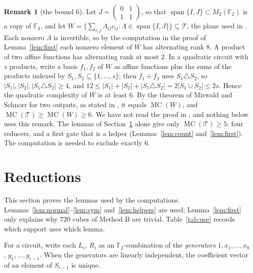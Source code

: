 \documentclass[11pt,a4paper]{article}
\theoremstyle{definition}
\newtheorem{remark}[theorem]{Remark}
\newcommand{\F}{\mathbb{F}}
\newcommand{\Tg}{\mathcal{T}}
\newcommand{\MC}{\operatorname{MC}}
\newcommand{\spn}{\operatorname{span}}
\begin{document}
\begin{remark}[the bound $6$]\label{rem:six}
Let $J=\begin{pmatrix}0&1\\1&1\end{pmatrix}$, so that $\spn\{I,J\}\subset M_2(\F_2)$ is a copy of $\F_4$, and let $W=\{\sum_{i,j}\Lambda_{ij}c_{ij}:\Lambda\in\spn\{I,J\}\}\subseteq\Tg$, the plane used in \cite{SDMF180}. Each nonzero $\Lambda$ is invertible, so by the computation in the proof of Lemma~\ref{lem:first} each nonzero element of $W$ has alternating rank $8$. A product of two affine functions has alternating rank at most $2$. In a quadratic circuit with $s$ products, write a basis $f_1,f_2$ of $W$ as affine functions plus the sums of the products indexed by $S_1,S_2\subseteq\{1,\dots,s\}$; then $f_1+f_2$ uses $S_1\triangle S_2$, so $|S_1|,|S_2|,|S_1\triangle S_2|\ge4$, and $12\le|S_1|+|S_2|+|S_1\triangle S_2|=2|S_1\cup S_2|\le2s$. Hence the quadratic complexity of $W$ is at least $6$. By the theorem of Mirwald and Schnorr for two outputs, as stated in \cite[\S2.1]{BoyarFind18}, it equals $\MC(W)$, and $\MC(\Tg)\ge\MC(W)\ge6$. We have not read the proof in \cite{MirwaldSchnorr92}, and nothing below uses this remark. The lemmas of Section~\ref{sec:lemmas} alone give only $\MC(\Tg)\ge5$: four reducers, and a first gate that is a helper (Lemmas~\ref{lem:count} and~\ref{lem:first}). The computation is needed to exclude exactly $6$.
\end{remark}

\section{Reductions}\label{sec:lemmas}

This section proves the lemmas used by the computations. Lemmas~\ref{lem:normal}--\ref{lem:sym} and~\ref{lem:helpers} are used; Lemma~\ref{lem:first} only explains why $720$ cubes of Method B are trivial. Table~\ref{tab:use} records which support uses which lemma.

For a circuit, write each $L_i$, $R_i$ as an $\F_2$-combination of the \emph{generators} $1,x_1,\dots,x_8$, $g_1,\dots,g_{i-1}$. When the generators are linearly independent, the coefficient vector of an element of $S_{i-1}$ is unique.
\end{document}
